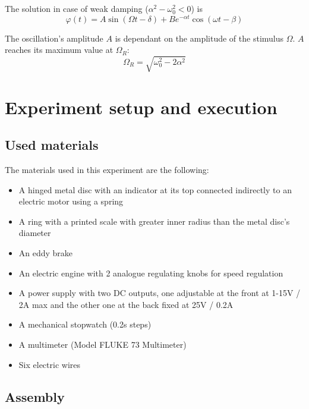 \documentclass{scrreprt}
\renewcommand{\phi}{\varphi}
\begin{document}
The solution in case of weak damping ($\alpha^2 - \omega_0^2 < 0$) is
\begin{equation}
\phi(t) = A \sin{(\Omega t - \delta)} + B e^{-\alpha t} \cos{(\omega t - \beta)} \label{eq:forceddampedsolution}
\end{equation}

The oscillation's amplitude $A$ is dependant on the amplitude of the stimulus $\Omega$. $A$ reaches its maximum value at $\Omega_R$:
\begin{equation}
\Omega_R = \sqrt{\omega_0^2-2\alpha^2}
\end{equation}

\section{Experiment setup and execution}
\subsection{Used materials}
The materials used in this experiment are the following:
\begin{itemize}
\item A hinged metal disc with an indicator at its top connected indirectly to an electric motor using a spring
\item A ring with a printed scale with greater inner radius than the metal disc's diameter
\item An eddy brake
\item An electric engine with 2 analogue regulating knobs for speed regulation
\item A power supply with two DC outputs, one adjustable at the front at 1-15V / 2A max and the other one at the back fixed at 25V / 0.2A
\item A mechanical stopwatch (0.2s steps)
\item A multimeter (Model FLUKE 73 Multimeter)
\item Six electric wires
\end{itemize}

\subsection{Assembly}
\end{document}
